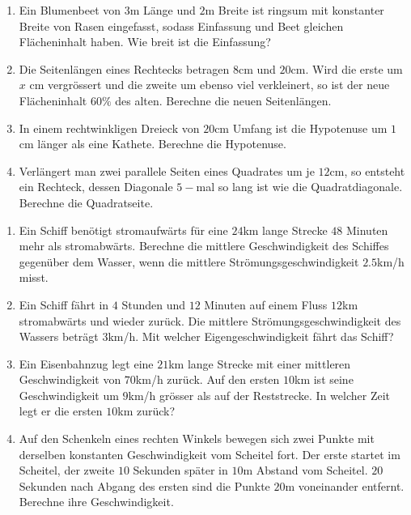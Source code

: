 \documentclass[11pt,oneside]{article}
\begin{document}
\begin{aufgabe}[Geometrie]
	\begin{enumerate}
		\item Ein Blumenbeet von $3$m Länge und $2$m Breite ist ringsum mit konstanter Breite von Rasen eingefasst, sodass Einfassung und Beet gleichen Flächeninhalt haben. Wie breit ist die Einfassung?
		\item Die Seitenlängen eines Rechtecks betragen $8$cm und $20$cm. Wird die erste um $x$ cm vergrössert und die zweite um ebenso viel verkleinert, so ist der neue Flächeninhalt $60\%$ des alten. Berechne die neuen Seitenlängen.
		\item In einem rechtwinkligen Dreieck von $20$cm Umfang ist die Hypotenuse um $1$cm länger als eine Kathete. Berechne die Hypotenuse.
		\item Verlängert man zwei parallele Seiten eines Quadrates um je $12$cm, so entsteht ein Rechteck, dessen Diagonale $5-$mal so lang ist wie die Quadratdiagonale. Berechne die Quadratseite.
	\end{enumerate}
\end{aufgabe}
\begin{aufgabe}[Bewegungen]
	\begin{enumerate}
		\item Ein Schiff benötigt stromaufwärts für eine $24$km lange Strecke $48$ Minuten mehr als stromabwärts. Berechne die mittlere Geschwindigkeit des Schiffes gegenüber dem Wasser, wenn die mittlere Strömungsgeschwindigkeit $2.5$km/h misst.
		\item Ein Schiff fährt in $4$ Stunden und $12$ Minuten auf einem Fluss $12$km stromabwärts und wieder zurück. Die mittlere Strömungsgeschwindigkeit des Wassers beträgt $3$km/h. Mit welcher Eigengeschwindigkeit fährt das Schiff?
		\item Ein Eisenbahnzug legt eine $21$km lange Strecke mit einer mittleren Geschwindigkeit von $70$km/h zurück. Auf den ersten $10$km ist seine Geschwindigkeit um $9$km/h grösser als auf der Reststrecke. In welcher Zeit legt er die ersten $10$km zurück?
		\item Auf den Schenkeln eines rechten Winkels bewegen sich zwei Punkte mit derselben konstanten Geschwindigkeit vom Scheitel fort. Der erste startet im Scheitel, der zweite $10$ Sekunden später in $10$m Abstand vom Scheitel. $20$ Sekunden nach Abgang des ersten sind die Punkte $20$m voneinander entfernt. Berechne ihre Geschwindigkeit.
	\end{enumerate}
\end{aufgabe}
\end{document}
